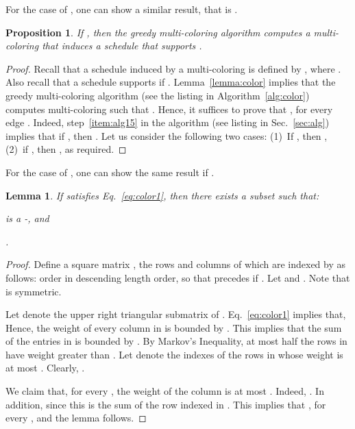\documentclass[11pt]{article}
\newenvironment{proof sketch}{\noindent {\bf Proof sketch:} }{\hfill \qed}
\newtheorem{proposition}{Proposition}
\newtheorem{lemma}{Lemma}
\newcommand{\barsignal}{}
\begin{document}
\noindent
For the case of , one can show a similar result, that is .

\begin{proposition}\label{prop:T}
  If  , then the greedy multi-coloring algorithm computes a
  multi-coloring  that induces a schedule that supports .
\end{proposition}
\begin{proof}
   Recall that a schedule  induced by a multi-coloring 
    is defined by 
   , where .
  Also recall that a schedule  supports  if 
  .
  Lemma~\ref{lemma:color} implies that the greedy multi-coloring algorithm 
  (see the listing in Algorithm~\ref{alg:color}) computes multi-coloring 
   such that .
  Hence, it suffices to prove that , for every edge . 
  Indeed, step~\ref{item:alg15} in the algorithm (see listing in Sec.~\ref{sec:alg}) 
  implies that if , then . 
  Let us consider the following two cases: (1)~If , 
  then , 
  (2)~if , then , as required.
\end{proof}
\noindent
For the case of , one can show the same result if .

\begin{lemma}\label{lemma:disperse}
  If  satisfies Eq.~\ref{eq:color1}, then there exists
  a subset  such that:
  \begin{inparaenum}[(i)]
  \item  is a -\barsignal, and
  \item .
  \end{inparaenum}
\end{lemma}

\begin{proof}
  Define a square matrix , the rows and columns of which are
  indexed by  as follows: order  in descending length order, so that 
  precedes  if .  Let  and . Note that  is symmetric.

  Let  denote the upper right triangular submatrix of .
  Eq.~\ref{eq:color1} implies that,  Hence, the weight of every column in  is
  bounded by . This implies that the sum of the entries in  is
  bounded by .  By Markov's Inequality, at most half the rows in
   have weight greater than .  Let  denote the
  indexes of the rows in  whose weight is at most .
Clearly, .

We claim that, for every , the weight of the column  is
at most . Indeed, . In
addition,  since this is the sum of the row indexed  in .
This implies that , for every , and the lemma follows.
\end{proof}
\end{document}
